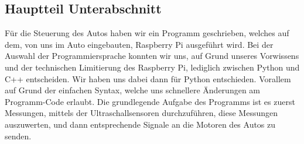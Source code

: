 \documentclass[a4paper,12pt]{article}
\begin{document}
\pagebreak

\subsection{Hauptteil Unterabschnitt}\label{sec2.2}

F\"ur die Steuerung des Autos haben wir ein Programm geschrieben, welches auf dem, von uns im Auto eingebauten,
Raspberry Pi ausgef\"uhrt wird. Bei der Auswahl der Programmiersprache konnten wir uns, auf Grund unseres Vorwissens und der
technischen Limitierung des Raspberry Pi, lediglich zwischen Python und C++ entscheiden. Wir haben uns dabei dann f\"ur
Python entschieden. Vorallem auf Grund der einfachen Syntax, welche uns schnellere \"Anderungen am Programm-Code erlaubt.
\newline
Die grundlegende Aufgabe des Programms ist es zuerst Messungen, mittels der Ultraschallsensoren durchzuf\"uhren, diese
Messungen auszuwerten, und dann entsprechende Signale an die Motoren des Autos zu senden.

\medskip
\end{document}
